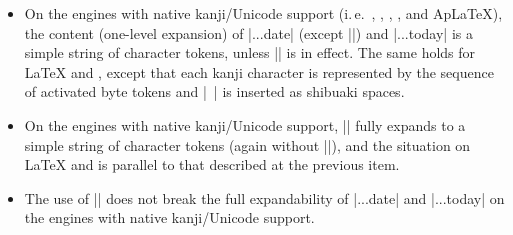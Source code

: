 \documentclass[a4paper]{article}
\newcommand{\Ie}{i.\,e.}
\newcommand*{\+}{\hspace{0.25em minus 0.25em}}
\begin{document}
\begin{itemize}
\item On the engines with native kanji/Unicode support
  (\Ie~{\LuaLaTeX}, {\XeLaTeX}, {\pLaTeX}, {\upLaTeX}, and {Ap\LaTeX}),
  the content (one-level expansion) of |\wareki...date|
  (except |\warekicustomdate|) and |\wareki...today|
  is a simple string of character tokens,
  unless |\WarekiUseCustomInterGlue| is in effect.
  The same holds for {\LaTeX} and {\pdfLaTeX},
  except that each kanji character is
  represented by the sequence of activated byte tokens
  and |~| is inserted as shibuaki spaces.
\item On the engines with native kanji/Unicode support,
  |\warekicustomdate| fully expands to a simple string
  of character tokens
  (again without |\WarekiUseCustomInterGlue|),
  and the situation on {\LaTeX} and {\pdfLaTeX}
  is parallel to that described at the previous item.
\item The use of |\WarekiUseCustomInterGlue|
  does not break the full expandability
  of |\wareki...date| and |\wareki...today|
  on the engines with native kanji/Unicode support.
\end{itemize}

\end{document}
